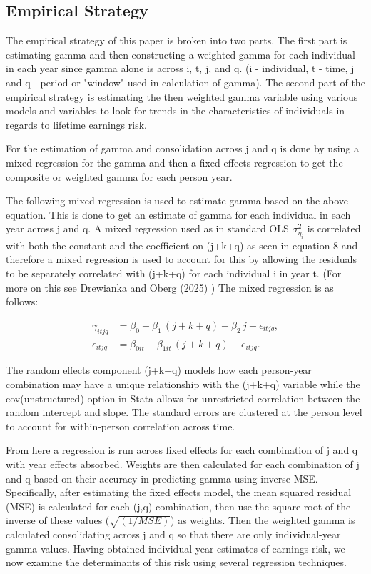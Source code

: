 \documentclass[12pt]{article}
\begin{document}
\begin{onehalfspace}

\section{Empirical Strategy}

The empirical strategy of this paper is broken into two parts. The first part is estimating gamma and then constructing a weighted gamma for each individual in each year since gamma alone is across i, t, j, and q. (i - individual, t - time, j and q - period or "window" used in calculation of gamma). The second part of the empirical strategy is estimating the then weighted gamma variable using various models and variables to look for trends in the characteristics of individuals in regards to lifetime earnings risk.

For the estimation of gamma and consolidation across j and q is done by using a mixed regression for the gamma and then a fixed effects regression to get the composite or weighted gamma for each person year.

The following mixed regression is used to estimate gamma based on the above equation. This is done to get an estimate of gamma for each individual in each year across j and q. A mixed regression used as in standard OLS $\sigma^2_{\eta_i}$ is correlated with both the constant and the coefficient on (j+k+q) as seen in equation 8 and therefore a mixed regression is used to account for this by allowing the residuals to be separately correlated with (j+k+q) for each individual i in year t. (For more on this see Drewianka and Oberg (2025) \cite{drewianka2025}) The mixed regression is as follows:

\begin{align}
\gamma_{itjq}
&= \beta_{0}
  + \beta_{1}\,(j + k + q)
  + \beta_{2}\,j
  + \epsilon_{itjq}, \\[1ex]
\epsilon_{itjq}
&= \beta_{0it}
  + \beta_{1it}\,(j + k + q)
  + e_{itjq}.
\end{align}

The random effects component (j+k+q) models how each person-year combination may have a unique relationship with the (j+k+q) variable while the cov(unstructured) option in Stata allows for unrestricted correlation between the random intercept and slope. The standard errors are clustered at the person level to account for within-person correlation across time.

From here a regression is run across fixed effects for each combination of j and q with year effects absorbed. Weights are then calculated for each combination of j and q based on their accuracy in predicting gamma using inverse MSE. Specifically, after estimating the fixed effects model, the mean squared residual (MSE) is calculated for each (j,q) combination, then use the square root of the inverse of these values ($\sqrt{(1/MSE)}$) as weights. Then the weighted gamma is calculated consolidating across j and q so that there are only individual-year gamma values. Having obtained individual-year estimates of earnings risk, we now examine the determinants of this risk using several regression techniques.


\end{onehalfspace}
\end{document}
